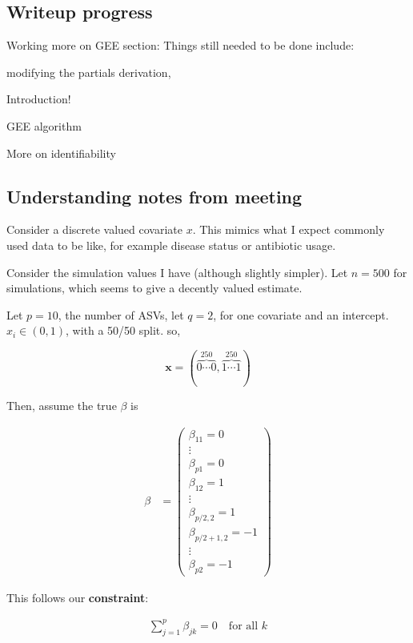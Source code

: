 \documentclass[10pt]{article}
\theoremstyle{definition}
\begin{document}
\subsection{Writeup progress}

Working more on GEE section:
Things still needed to be done include:

\begin{todolist}
  \item  modifying the partials derivation,
  \item Introduction!
  \item GEE algorithm
  \item More on identifiability
\end{todolist}


\subsection{Understanding notes from meeting}

Consider a discrete valued covariate $x$. This mimics what I expect commonly used data to be like, for example disease status or antibiotic usage.

Consider the simulation values I have (although slightly simpler). Let $n = 500$ for simulations, which seems to give a decently valued estimate.

Let $p = 10$, the number of ASVs, let $q = 2$, for one covariate and an intercept. $x_i \in (0,1)$, with a 50/50 split. so,

\[\mathbf{x} = (\overbrace{0 \cdots 0}^{250}, \overbrace{1 \cdots 1}^{250}) \]


Then, assume the true $\beta$ is

\begin{align*}
  \beta &= \begin{pmatrix} \beta_{11} = 0 \\ \vdots \\
\beta_{p1} = 0 \\
\beta_{12} = 1 \\ \vdots \\\beta_{p/2,2} = 1 \\\beta_{p/2 + 1,2} = -1\\ \vdots \\ \beta_{p2} = -1 \end{pmatrix}
\end{align*}

This follows our \textbf{constraint}:

\begin{align*}
  \sum_{j = 1}^p \beta_{jk} = 0 \quad \text{for all } k
\end{align*}
\end{document}
